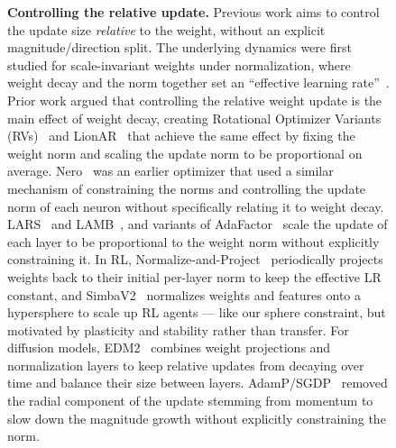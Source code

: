 \documentclass[10pt]{article} %
\begin{document}
\begin{figure}[t]
\textbf{Controlling the relative update.} Previous work aims to control the update size \emph{relative} to the weight, without an explicit magnitude/direction split. The underlying dynamics were first studied for scale-invariant weights under normalization, where weight decay and the norm together set an ``effective learning rate''~\citep{vanlaarhoven2017l2,hoffer2018norm,arora2019theoretical,li2020exponential,wan2021spherical,kodryan2022training,kosson2026balanced}. Prior work argued that controlling the relative weight update is the main effect of weight decay, creating Rotational Optimizer Variants (RVs)~\citep{kosson2023rotational} and LionAR~\citep{kosson2024analyzing} that achieve the same effect by fixing the weight norm and scaling the update norm to be proportional on average. Nero~\citep{liu2021learning} was an earlier optimizer that used a similar mechanism of constraining the norms and controlling the update norm of each neuron without specifically relating it to weight decay. LARS~\citep{you2017large} and LAMB~\citep{you2019large}, and variants of AdaFactor~\citep{zhai2021scaling} scale the update of each layer to be proportional to the weight norm without explicitly constraining it. In RL, Normalize-and-Project~\citep{lyle2024normalization} periodically projects weights back to their initial per-layer norm to keep the effective LR constant, and SimbaV2~\citep{lee2025hyperspherical} normalizes weights and features onto a hypersphere to scale up RL agents --- like our sphere constraint, but motivated by plasticity and stability rather than transfer. For diffusion models, EDM2~\citep{karras2023analyzing} combines weight projections and normalization layers to keep relative updates from decaying over time and balance their size between layers. AdamP/SGDP~\citep{heo2021adamp} removed the radial component of the update stemming from momentum to slow down the magnitude growth without explicitly constraining the norm.


\end{figure}
\end{document}
